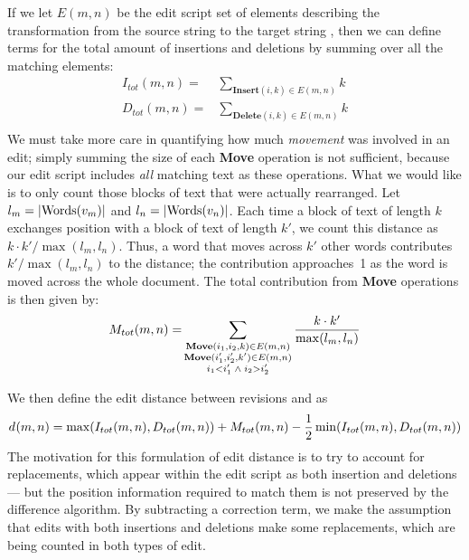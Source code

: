If we let $E(m,n)$ be the edit script set of elements describing the
transformation from the source string 
to the target string ,
then we can define terms for the total amount of insertions and
deletions by summing over all the matching elements:
\begin{align*}
  I_{tot}(m,n) =& \sum_{\mathbf{Insert}(i, k) \in E(m,n)} k \\
  D_{tot}(m,n) =& \sum_{\mathbf{Delete}(i, k) \in E(m,n)} k \\
\end{align*}
%
We must take more care in quantifying how much \textit{movement}
was involved in an edit; simply summing the size of each
\textbf{Move} operation is not sufficient, because our edit script
includes \textit{all} matching text as these operations.
What we would like is to only count those blocks of text that
were actually rearranged.
Let $l_m = | \mathrm{Words}(v_{m}) |$ and $l_n = | \mathrm{Words}(v_{n}) |$.
Each time a block of text of length $k$ exchanges position
with a block of text of length $k'$, we count this distance
as $k \cdot k' / \max(l_m, l_n)$.
Thus, a word that moves across $k'$ other words contributes
$k' / \max(l_m, l_n)$ to the distance; the contribution
approaches~1 as the word is moved across the whole document.
The total contribution from \textbf{Move} operations is
then given by:
%
\begin{align*}
  M_{tot}(m,n) =& \sum_{\substack{
        \mathbf{Move}(i_1, i_2, k) \in E(m,n) \\
        \mathbf{Move}(i'_1, i'_2, k') \in E(m,n) \\
        i_1 < i'_1 \;\wedge\; i_2 > i'_2
        }} \frac{k \cdot k'}{\max(l_m, l_n)} \\
\end{align*}

We then define the edit distance between revisions
 and  as
\begin{equation}
    \dist{}{m,n} = \max(I_{tot}(m,n), D_{tot}(m,n))
        + M_{tot}(m,n)
        - \frac{1}{2}\min(I_{tot}(m,n), D_{tot}(m,n)) \\
\label{eq:dist}
\end{equation}
The motivation for this formulation of edit distance is
to try to account for replacements, which appear within
the edit script as both insertion and deletions --- but the
position information required to match them is not preserved
by the difference algorithm.
By subtracting a correction term, we make the assumption
that edits with both insertions and deletions make some
replacements, which are being counted in both types of edit.


